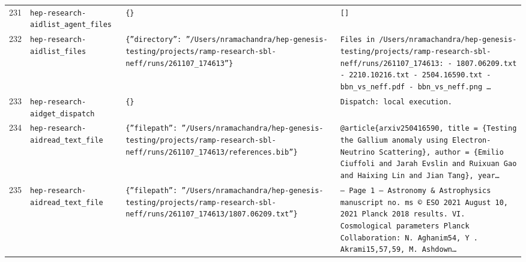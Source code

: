 \documentclass[11pt,a4paper]{article}
\begin{document}
\begin{longtable}{@{}p{}p{}p{}p{}@{}}
231 & \texttt{hep-research-aid}\newline\texttt{list\_\allowbreak{}agent\_\allowbreak{}files} & \texttt{\{\}\allowbreak{}} & \texttt{[]\allowbreak{}} \\
232 & \texttt{hep-research-aid}\newline\texttt{list\_\allowbreak{}files} & \texttt{\{''directory'':\allowbreak{} ''/\allowbreak{}Users/\allowbreak{}nramachandra/\allowbreak{}hep-genesis-testing/\allowbreak{}projects/\allowbreak{}ramp-research-sbl-neff/\allowbreak{}runs/\allowbreak{}261107\_\allowbreak{}174613''\}\allowbreak{}} & \texttt{Files in /\allowbreak{}Users/\allowbreak{}nramachandra/\allowbreak{}hep-genesis-testing/\allowbreak{}projects/\allowbreak{}ramp-research-sbl-neff/\allowbreak{}runs/\allowbreak{}261107\_\allowbreak{}174613:\allowbreak{}   - 1807.06209.txt   - 2210.10216.txt   - 2504.16590.txt   - bbn\_\allowbreak{}vs\_\allowbreak{}neff.pdf   - bbn\_\allowbreak{}vs\_\allowbreak{}neff.png   \ldots{}\allowbreak{}} \\
233 & \texttt{hep-research-aid}\newline\texttt{get\_\allowbreak{}dispatch} & \texttt{\{\}\allowbreak{}} & \texttt{Dispatch:\allowbreak{} local execution.} \\
234 & \texttt{hep-research-aid}\newline\texttt{read\_\allowbreak{}text\_\allowbreak{}file} & \texttt{\{''filepath'':\allowbreak{} ''/\allowbreak{}Users/\allowbreak{}nramachandra/\allowbreak{}hep-genesis-testing/\allowbreak{}projects/\allowbreak{}ramp-research-sbl-neff/\allowbreak{}runs/\allowbreak{}261107\_\allowbreak{}174613/\allowbreak{}references.bib''\}\allowbreak{}} & \texttt{@article\{arxiv250416590,\allowbreak{}   title =\allowbreak{} \{Testing the Gallium anomaly using Electron-Neutrino Scattering\}\allowbreak{},\allowbreak{}   author =\allowbreak{} \{Emilio Ciuffoli and Jarah Evslin and Ruixuan Gao and Haixing Lin and Jian Tang\}\allowbreak{},\allowbreak{}   year\ldots{}\allowbreak{}} \\
235 & \texttt{hep-research-aid}\newline\texttt{read\_\allowbreak{}text\_\allowbreak{}file} & \texttt{\{''filepath'':\allowbreak{} ''/\allowbreak{}Users/\allowbreak{}nramachandra/\allowbreak{}hep-genesis-testing/\allowbreak{}projects/\allowbreak{}ramp-research-sbl-neff/\allowbreak{}runs/\allowbreak{}261107\_\allowbreak{}174613/\allowbreak{}1807.06209.txt''\}\allowbreak{}} & \texttt{--- Page 1 --- Astronomy \& Astrophysics manuscript no. ms © ESO 2021 August 10,\allowbreak{} 2021 Planck 2018 results. VI. Cosmological parameters Planck Collaboration:\allowbreak{} N. Aghanim54,\allowbreak{} Y . Akrami15,\allowbreak{}57,\allowbreak{}59,\allowbreak{} M. Ashdown\ldots{}\allowbreak{}} \\

\end{longtable}
\end{document}
